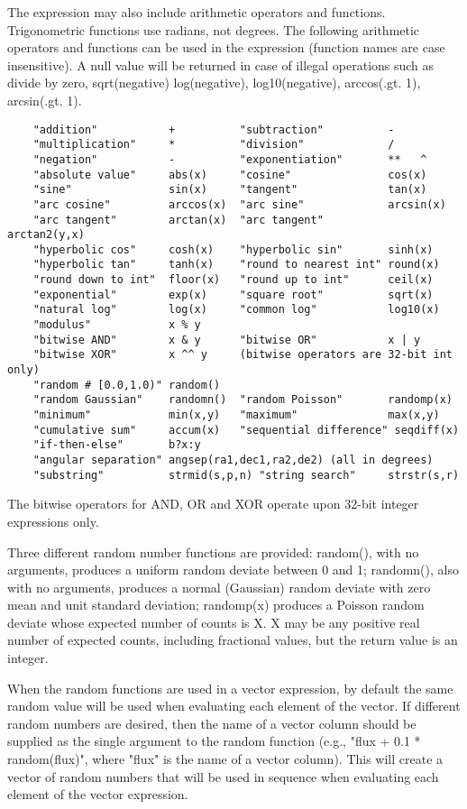 \documentclass[11pt]{book}
\begin{document}
The expression may  also include arithmetic operators and functions.
Trigonometric  functions use  radians,  not degrees.  The  following
arithmetic  operators and  functions  can be  used in the expression
(function names are case insensitive).  A null value will be returned
in case of illegal operations such as divide by zero, sqrt(negative)
log(negative), log10(negative), arccos(.gt. 1), arcsin(.gt. 1).

\begin{verbatim}
    "addition"           +          "subtraction"          -
    "multiplication"     *          "division"             /
    "negation"           -          "exponentiation"       **   ^
    "absolute value"     abs(x)     "cosine"               cos(x)
    "sine"               sin(x)     "tangent"              tan(x)
    "arc cosine"         arccos(x)  "arc sine"             arcsin(x)
    "arc tangent"        arctan(x)  "arc tangent"          arctan2(y,x)
    "hyperbolic cos"     cosh(x)    "hyperbolic sin"       sinh(x)
    "hyperbolic tan"     tanh(x)    "round to nearest int" round(x)
    "round down to int"  floor(x)   "round up to int"      ceil(x)
    "exponential"        exp(x)     "square root"          sqrt(x)
    "natural log"        log(x)     "common log"           log10(x)
    "modulus"            x % y      
    "bitwise AND"        x & y      "bitwise OR"           x | y
    "bitwise XOR"        x ^^ y     (bitwise operators are 32-bit int only)
    "random # [0.0,1.0)" random()
    "random Gaussian"    randomn()  "random Poisson"       randomp(x)
    "minimum"            min(x,y)   "maximum"              max(x,y)
    "cumulative sum"     accum(x)   "sequential difference" seqdiff(x)
    "if-then-else"       b?x:y
    "angular separation" angsep(ra1,dec1,ra2,de2) (all in degrees)
    "substring"          strmid(s,p,n) "string search"     strstr(s,r)
\end{verbatim}
The bitwise operators for AND, OR and XOR operate upon 32-bit integer 
expressions only.

Three different random number functions are provided: random(), with
no arguments, produces a uniform random deviate between 0 and 1;
randomn(), also with no arguments, produces a normal (Gaussian) random
deviate with zero mean and unit standard deviation; randomp(x)
produces a Poisson random deviate whose expected number of counts is
X.  X may be any positive real number of expected counts, including
fractional values, but the return value is an integer.

When the random functions are used in a vector expression, by default
the same random value will be used when evaluating each element of the
vector.  If different random numbers are desired, then the name of a
vector column should be supplied as the single argument to the random
function (e.g., "flux + 0.1 * random(flux)", where "flux" is the name
of a vector column).  This will create a vector of random numbers that
will be used in sequence when evaluating each element of the vector
expression.
\end{document}
